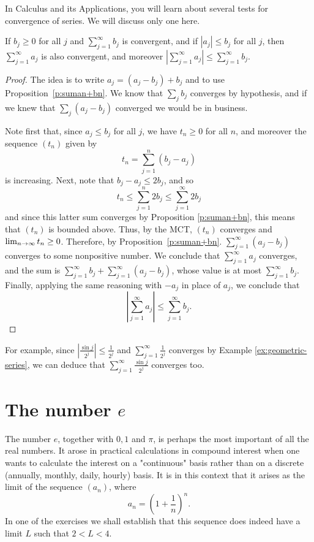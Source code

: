 \documentclass[11pt,dvipsnames]{book}
\numberwithin{equation}{section} %
\numberwithin{figure}{section} %
\numberwithin{table}{section} %
\begin{document}
\medskip
In Calculus and its Applications, you will learn about several tests for convergence of series. We will discuss only one here.

\begin{theorem}
If $b_j \geq 0$ for all $j$ and $\sum_{j=1}^\infty b_{j}$ is convergent, and if $|a_{j}|\leq b_{j}$ for all $j$, then $\sum_{j=1}^\infty a_{j}$ is also convergent, and
moreover $ |\sum_{j=1}^\infty a_j| \leq \sum_{j=1}^\infty b_j.$ 
\end{theorem}

\begin{proof}
The idea is to write $a_j = (a_j - b_j) + b_j$ and to use Proposition~\ref{p:suman+bn}. We know that $\sum_j b_j$ converges by hypothesis, and if we knew that $\sum_j(a_j - b_j)$ converged we would be in business.  

Note first that, since $a_j \leq b_j$ for all $j$, we have $t_n \geq 0$ for all $n$, and moreover the sequence $(t_n)$ given by
\[
t_{n}=\sum_{j=1}^{n}(b_{j}-a_{j})
\]
is increasing. Next, note that $b_{j}-a_{j}\leq 2b_{j}$, and so
\[
t_{n}\leq \sum_{j=1}^{n}2b_{j}\leq \sum_{j=1}^{\infty}2b_{j}\]
and since this latter sum converges by Proposition \ref{p:suman+bn}, this means that $(t_{n})$ is bounded above. Thus, by the MCT, $(t_{n})$ converges
and $\lim_{n\rightarrow\infty} t_n \geq 0$. Therefore, by Proposition~\ref{p:suman+bn}. $\sum_{j=1}^\infty(a_j - b_j)$
converges to some nonpositive number. 
We conclude that $\sum_{j=1}^\infty a_{j}$ converges, and the sum is $\sum_{j=1}^\infty b_j + \sum_{j=1}^\infty (a_j - b_j)$, whose value is at most $\sum_{j=1}^\infty b_j$. Finally, applying the same reasoning with $-a_j$ in place of $a_j$, we conclude that
\[
|\sum_{j=1}^\infty a_j| \leq \sum_{j=1}^\infty b_j.
\]
\end{proof}

For example, since $\left|\frac{\sin j}{2^{j}}\right|\leq \frac{1}{2^{j}}$ and $\sum_{j=1}^\infty \frac{1}{2^{j}}$ converges by Example \ref{ex:geometric-series}, we can deduce that $\sum_{j=1}^\infty \frac{\sin j}{2^{j}}$ converges too.

\section{The number $e$}
The number $e$, together with $0,1$ and $\pi$, is perhaps the most important of all the real numbers.
It arose in practical calculations in compound interest when one wants to calculate the interest on a "continuous" basis rather than on a discrete (annually, monthly, daily, hourly) basis. It is in this context that it arises as the limit of the sequence $(a_n)$, where
\[ a_n = \left(1 + \frac{1}{n}\right)^n.\]
In one of the exercises we shall establish that this sequence does indeed have a limit $L$ such that $2 < L < 4$. 
\end{document}
